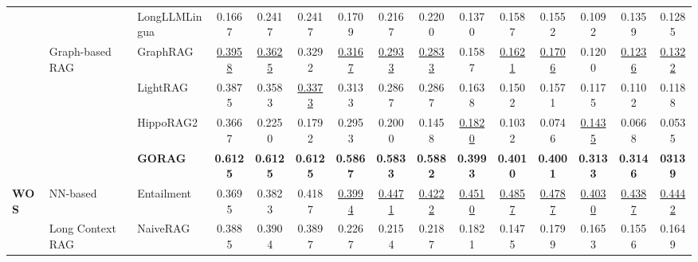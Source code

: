 \begin{table}[t]
{\begin{tabular}{l|l|l|ccc|ccc|ccc|ccc}
			&   & LongLLMLingua        \cite{jiang-etal-2024-longllmlingua}              &     0.1667  &   0.2417   &     0.2417   &        0.1709   &    0.2167   &     0.2200    & 0.1370     &  0.1587       &    0.1552     &   0.1092      &    0.1359      &     0.1285    \\ \cline{2-15}
			&         \multirow{4}{*}{Graph-based RAG}                              & GraphRAG       \cite{edge2024local}                  &   \underline{0.3958}    &      \underline{0.3625} &     {0.3292}   &    \underline{0.3167}       &    \underline{0.2933}   &      \underline{0.2833}   & 0.1587     &   \underline{0.1621}      &   \underline{0.1706}      &     0.1200    &   \underline{0.1236}       &        \underline{0.1322}    \\
			&                                     & LightRAG      \cite{guo2024lightrag}                     &   0.3875	    &   0.3583   &      \underline{0.3373}   &      0.3133     &     0.2867 &   0.2867      &  0.1638    &      0.1502    &      0.1571   &     0.1175    &   0.1102       &    0.1188      \\
			&                                     & HippoRAG2     \cite{gutiérrez2025ragmemory}               &    0.3667   &     0.2250 &    0.1792    &   0.2953        &    0.2000    &    0.1458    &     \underline{0.1820} &     0.1032    &    0.0746     &    \underline{0.1435}     &         0.0668 &    0.0535    \\ 
			&                                     & \textbf{GORAG}            &   \textbf{0.6125}    &   \textbf{0.6125}      &     \textbf{0.6125}       &  \textbf{ 0.5867}    &  \textbf{0.5833}     &    \textbf{0.5882}       &     \textbf{0.3993}    &   \textbf{0.4010}      &     \textbf{0.4001}        &       \textbf{0.3133}  &    \textbf{0.3146}        &        \textbf{03139}            \\ \hline\hline
			\multirow{7}{*}{\textbf{WOS}}     & \multirow{1}{*}{NN-based}           & Entailment    \cite{xia-etal-2021-incremental}                   & {0.3695}          & {0.3823}          & {0.4187}           & \underline{0.3994}          & \underline{0.4471}          & \underline{0.4222}           & \underline{0.4510}          & \underline{0.4857}          & \underline{0.4787}           & \underline{0.4030}          & \underline{0.4387}          & \underline{0.4442}            \\
			\cline{2-15}
			& \multirow{2}{*}{Long Context RAG}   & NaiveRAG      \cite{gao2023retrieval}                   & 0.3885          & {0.3904}          & 0.3897           & 0.2267          & 0.2154          & 0.2187           & 0.1821          & 0.1475          & 0.1799           & 0.1653          & 0.1556          & 0.1649            \\
			

\end{tabular}}
\end{table}
